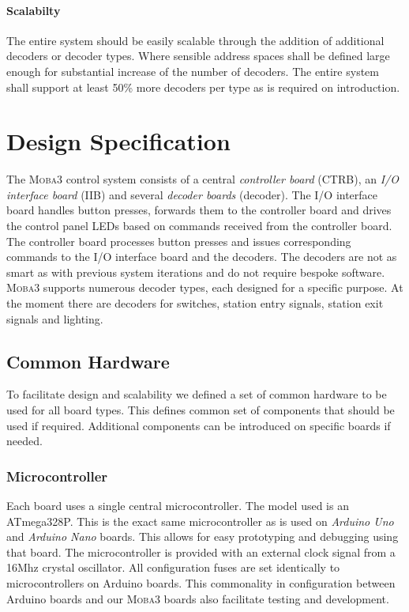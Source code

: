 \documentclass{scrreprt}
\begin{document}
\subsubsection{Scalabilty}
The entire system should be easily scalable through the addition of additional decoders or decoder types.
Where sensible address spaces shall be defined large enough for substantial increase of the number of decoders.
The entire system shall support at least 50\% more decoders per type as is required on introduction.

\chapter{Design Specification}
The \textsc{Moba3} control system consists of a central \emph{controller board} (CTRB), an \emph{I/O interface board} (IIB) and several \emph{decoder boards} (decoder).
The I/O interface board handles button presses, forwards them to the controller board and drives the control panel LEDs based on commands received from the controller board.
The controller board processes button presses and issues corresponding commands to the I/O interface board and the decoders.
The decoders are not as smart as with previous system iterations and do not require bespoke software.
\textsc{Moba3} supports numerous decoder types, each designed for a specific purpose.
At the moment there are decoders for switches, station entry signals, station exit signals and lighting.

\section{Common Hardware}
To facilitate design and scalability we defined a set of common hardware to be used for all board types.
This defines common set of components that should be used if required.
Additional components can be introduced on specific boards if needed.

\subsection{Microcontroller}
Each board uses a single central microcontroller.
The model used is an ATmega328P.
This is the exact same microcontroller as is used on \emph{Arduino Uno} and \emph{Arduino Nano} boards.
This allows for easy prototyping and debugging using that board.
The microcontroller is provided with an external clock signal from a 16Mhz crystal oscillator.
All configuration fuses are set identically to microcontrollers on Arduino boards.
This commonality in configuration between Arduino boards and our \textsc{Moba3} boards also facilitate testing and development.
\end{document}

